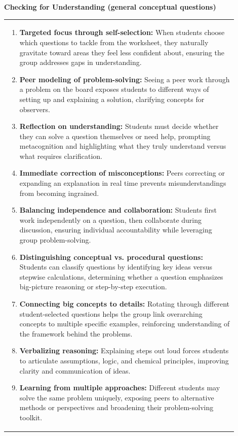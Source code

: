 \documentclass{article}
\begin{document}
\newpage
{\large\textbf{Checking for Understanding (general conceptual questions)}}\\
\noindent \begin{tabular}{|p{0.9\linewidth}|}
\hline
\vspace{0.2cm}

\begin{enumerate}
    \item \textbf{Targeted focus through self-selection:} When students choose which questions to tackle from the worksheet, they naturally gravitate toward areas they feel less confident about, ensuring the group addresses gaps in understanding.
    \item \textbf{Peer modeling of problem-solving:} Seeing a peer work through a problem on the board exposes students to different ways of setting up and explaining a solution, clarifying concepts for observers.
    \item \textbf{Reflection on understanding:} Students must decide whether they can solve a question themselves or need help, prompting metacognition and highlighting what they truly understand versus what requires clarification.
    \item \textbf{Immediate correction of misconceptions:} Peers correcting or expanding an explanation in real time prevents misunderstandings from becoming ingrained.
    \item \textbf{Balancing independence and collaboration:} Students first work independently on a question, then collaborate during discussion, ensuring individual accountability while leveraging group problem-solving.
    \item \textbf{Distinguishing conceptual vs. procedural questions:} Students can classify questions by identifying key ideas versus stepwise calculations, determining whether a question emphasizes big-picture reasoning or step-by-step execution.
    \item \textbf{Connecting big concepts to details:} Rotating through different student-selected questions helps the group link overarching concepts to multiple specific examples, reinforcing understanding of the framework behind the problems.
    \item \textbf{Verbalizing reasoning:} Explaining steps out loud forces students to articulate assumptions, logic, and chemical principles, improving clarity and communication of ideas.
    \item \textbf{Learning from multiple approaches:} Different students may solve the same problem uniquely, exposing peers to alternative methods or perspectives and broadening their problem-solving toolkit.

\end{enumerate}
\end{tabular}
\end{document}
